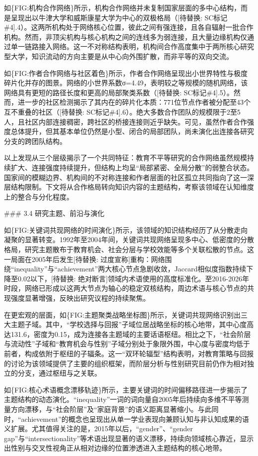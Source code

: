 \documentclass[12pt,a4paper]{article}
\begin{document}
如\{FIG:机构合作网络\}所示，机构合作网络并未复制国家层面的多中心结构，而是呈现出以牛津大学和威斯康星大学为中心的双极格局（[待替换: SC标记\#4].4）。这两所机构处于网络核心位置，彼此之间有强连接，且各自辐射一批合作机构。然而，非顶尖机构与核心机构之间的连线多为弱连接，且大量边缘机构仅通过单一链路接入网络。这一不对称结构表明，机构间合作高度集中于两所核心研究型大学，知识流动的方向主要是从中心向外围扩散，而非平等的双向交流。

如\{FIG:作者合作网络与社区着色\}所示，作者合作网络呈现出小世界特性与极度碎片化并存的图景。网络的小世界系数σ=4.49，表明较之等规模的随机网络，该网络具有更短的路径长度和更高的局部聚类系数（[待替换: SC标记\#4].5）。然而，进一步的社区检测揭示了其内在的碎片化本质：771位节点作者被分配至43个互不重叠的社区（[待替换: SC标记\#4].6）。绝大多数合作团队的规模限于2至5人，且社区内部连接稠密，跨社区的桥接连接则近乎缺失。可见，虽然作者合作强度总体提升，但其基本单位仍然是小型、闭合的局部团队，尚未演化出连接各研究分支的跨团队结构。

以上发现从三个层级揭示了一个共同特征：教育不平等研究的合作网络虽然规模持续扩大、连接强度持续提升，但结构上均呈“局部紧密、全局分散”的弱整合状态。国家间的模糊边界、机构间的不对称连接和作者层面的社区孤立共同指向了这一深层结构限制。下文将从合作格局转向知识内容的主题结构，考察该领域在认知维度上的整合与分化程度。

\#\#\# 3.4 研究主题、前沿与演化

如\{FIG:关键词共现网络的时间演化\}所示，该领域的知识结构经历了从分散走向凝聚的显著转变。1992年至2004年间，关键词共现网络呈现多中心、低密度的分散格局，研究主题散布于教育机会、社会分层与学校效能等多个关联松散的节点。这一局面在2005年后发生[待替换: 过度宣称]重构：网络围绕“inequality”与“achievement”两大核心节点急剧收敛，Jaccard相似度指数持续下降至0.02以下，[待替换: 绝对断言]领域内术语使用的高度标准化。至2016-2026年时段，网络已形成以这两大节点为轴心的稳定双核结构，周边术语与核心节点的共现强度显著增强，反映出研究议程的持续聚焦。

在更宏观的层面，如\{FIG:主题聚类战略坐标图\}所示，关键词共现网络识别出三大主题子域。其中，“学校选择与回报”子域位居战略坐标的核心地带，其中心度高达131.6，密度为0.15，成为连接各主题域的主要话语枢纽。相比之下，“社会阶层与流动性”子域和“教育机会与性别”子域分别处于象限外围，中心度与密度均低于前者，构成依附于枢纽的子辐条。这一“双环轮辐型”结构表明，对教育策略与回报的讨论为该领域提供了主要的组织框架，而阶层分析与性别研究目前仍作为相对独立的分支，通过枢纽与之关联。

如\{FIG:核心术语概念漂移轨迹\}所示，主要关键词的时间偏移路径进一步揭示了主题结构的动态演化。“inequality”一词的词向量自2005年后持续向多维不平等测量方向漂移，与“社会阶层”及“家庭背景”的语义距离显著缩小。与此同时，“achievement”的概念也呈现出从单一学业表现向兼顾认知与非认知成果的语义扩展。尤其值得关注的是，2015年以后，“gender”、“gender gap”与“intersectionality”等术语出现显著的语义漂移，持续向领域核心靠近，显示出性别与交叉性视角正从相对边缘的位置渗透进入主题结构的核心地带。
\end{document}
